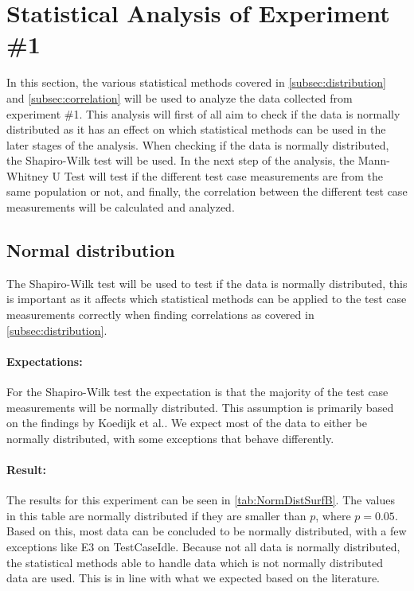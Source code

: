 \section{Statistical Analysis of Experiment \#1}\label{sec:Stat1}

In this section, the various statistical methods covered in \cref{subsec:distribution} and \cref{subsec:correlation} will be used to analyze the data collected from experiment \#1. This analysis will first of all aim to check if the data is normally distributed as it has an effect on which statistical methods can be used in the later stages of the analysis. When checking if the data is normally distributed, the Shapiro-Wilk test\cite{razali2011power} will be used. In the next step of the analysis, the Mann-Whitney U Test\cite{mann1947test} will test if the different test case measurements are from the same population or not, and finally, the correlation between the different test case measurements will be calculated and analyzed.

\subsection{Normal distribution}\label{subsec:NormalDist1}
The Shapiro-Wilk test will be used to test if the data is normally distributed, this is important as it affects which statistical methods can be applied to the test case measurements correctly when finding correlations as covered in \cref{subsec:distribution}. 

\paragraph{Expectations:} For the Shapiro-Wilk test the expectation is that the majority of the test case measurements will be normally distributed. This assumption is primarily based on the findings by Koedijk et al.\cite{Koedijk2022diff}. We expect most of the data to either be normally distributed, with some exceptions that behave differently.

\paragraph{Result:} The results for this experiment can be seen in \cref{tab:NormDistSurfB}. The values in this table are normally distributed if they are smaller than $p$, where $p = 0.05$\cite{subsec:distribution}. Based on this, most data can be concluded to be normally distributed, with a few exceptions like E3 on TestCaseIdle. Because not all data is normally distributed, the statistical methods able to handle data which is not normally distributed data are used. This is in line with what we expected based on the literature.


